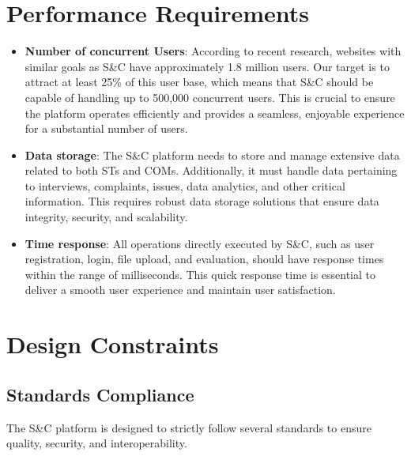 \section{Performance Requirements}
\begin{itemize}
    \item \textbf{Number of concurrent Users}: According to recent research, websites with similar goals as S\&C have approximately 1.8 million users. Our target is to attract at least 25\% of this user base, which means that S\&C should be capable of handling up to 500,000 concurrent users. This is crucial to ensure the platform operates efficiently and provides a seamless, enjoyable experience for a substantial number of users.

    \item \textbf{Data storage}: The S\&C platform needs to store and manage extensive data related to both STs and COMs. Additionally, it must handle data pertaining to interviews, complaints, issues, data analytics, and other critical information. This requires robust data storage solutions that ensure data integrity, security, and scalability.

    \item \textbf{Time response}: All operations directly executed by S\&C, such as user registration, login, file upload, and evaluation, should have response times within the range of milliseconds. This quick response time is essential to deliver a smooth user experience and maintain user satisfaction. 
   
\end{itemize}

\pagebreak
\section{Design Constraints}
\subsection{Standards Compliance}
The S\&C platform is designed to strictly follow several standards to ensure quality, security, and interoperability. 

